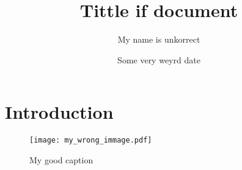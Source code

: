 \documentclass{article}
\title{Tittle if document}
\author{My name is unkorrect}
\date{Some very weyrd date}
\begin{document}
\maketitle

\section{Introduction}



\begin{figure}
    \centering
    \texttt{[image: my\_wrong\_immage.pdf]} %
    \caption{My good caption} %
    \label{fig:my_wrong_labell} %
\end{figure}
\end{document}
